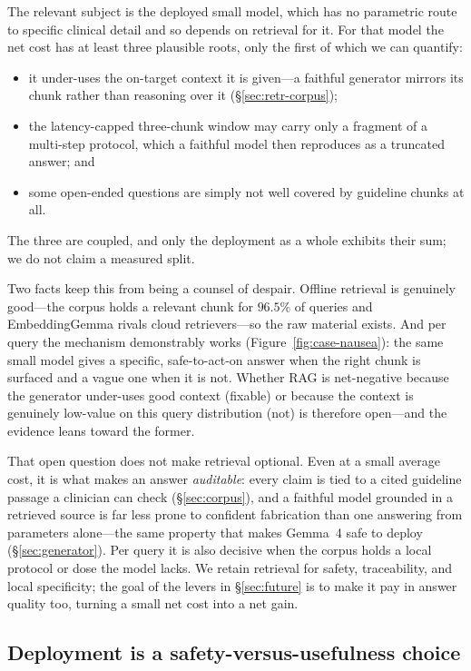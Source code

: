 The relevant subject is the deployed small model, which has no parametric route
to specific clinical detail and so depends on retrieval for it. For that model
the net cost has at least three plausible roots, only the first of which we can
quantify:
\begin{itemize}\setlength{\itemsep}{1.5pt}
  \item it under-uses the on-target context it is given---a faithful generator
  mirrors its chunk rather than reasoning over it (\S\ref{sec:retr-corpus});
  \item the latency-capped three-chunk window may carry only a fragment of a
  multi-step protocol, which a faithful model then reproduces as a truncated
  answer; and
  \item some open-ended questions are simply not well covered by guideline
  chunks at all.
\end{itemize}
The three are coupled, and only the deployment as a whole exhibits their sum;
we do not claim a measured split.

Two facts keep this from being a counsel of despair. Offline retrieval is
genuinely good---the corpus holds a relevant chunk for $96.5\%$ of queries and
EmbeddingGemma rivals cloud retrievers---so the raw material exists. And per
query the mechanism demonstrably works (Figure~\ref{fig:case-nausea}): the same
small model gives a specific, safe-to-act-on answer when the right chunk is
surfaced and a vague one when it is not. Whether RAG is net-negative because the
generator under-uses good context (fixable) or because the context is genuinely
low-value on this query distribution (not) is therefore open---and the evidence
leans toward the former.

That open question does not make retrieval optional. Even at a small average
cost, it is what makes an answer \emph{auditable}: every claim is tied to a
cited guideline passage a clinician can check (\S\ref{sec:corpus}), and a
faithful model grounded in a retrieved source is far less prone to confident
fabrication than one answering from parameters alone---the same property that
makes Gemma~4 safe to deploy (\S\ref{sec:generator}). Per query it is also
decisive when the corpus holds a local protocol or dose the model lacks. We
retain retrieval for safety, traceability, and local specificity; the goal of
the levers in \S\ref{sec:future} is to make it pay in answer quality too,
turning a small net cost into a net gain.

\subsection{Deployment is a safety-versus-usefulness choice}


